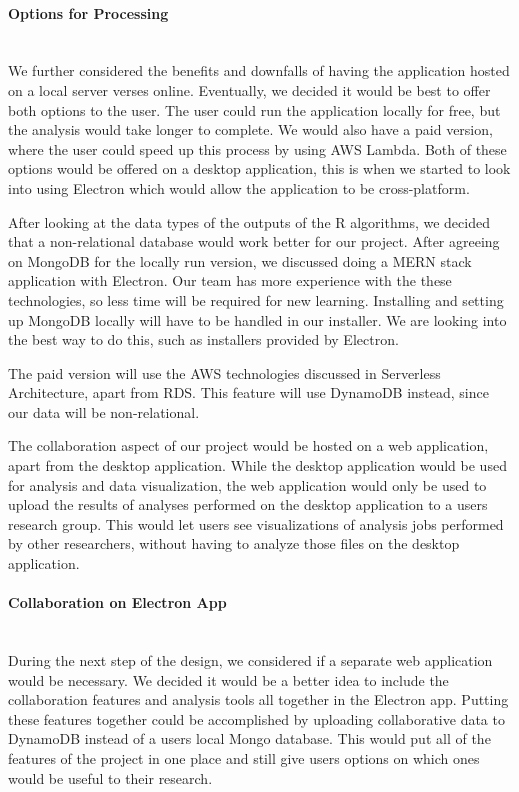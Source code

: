 \paragraph{Options for Processing} \mbox{}\\[\paragraphheaderspace]
We further considered the benefits and downfalls of having the application hosted on a local server verses online. Eventually, we decided it would be best to offer both options to the user. The user could run the application locally for free, but the analysis would take longer to complete. We would also have a paid version, where the user could speed up this process by using AWS Lambda. Both of these options would be offered on a desktop application, this is when we started to look into using Electron which would allow the application to be cross-platform.\par
After looking at the data types of the outputs of the  R algorithms, we decided that a non-relational database would work better for our project. After agreeing on MongoDB for the locally run version, we discussed doing a MERN stack application with Electron. Our team has more experience with the these technologies, so less time will be required for new learning. Installing and setting up MongoDB locally will have to be handled in our installer. We are looking into the best way to do this, such as installers provided by Electron.\par
The paid version will use the AWS technologies discussed in Serverless Architecture, apart from RDS. This feature will use DynamoDB instead, since our data will be non-relational.\par
The collaboration aspect of our project would be hosted on a web application, apart from the desktop application. While the desktop application would be used for analysis and data visualization, the web application would only be used to upload the results of analyses performed on the desktop application to a user\textquotesingle s research group. This would let users see visualizations of analysis jobs performed by other researchers, without having to analyze those files on the desktop application.\par

\paragraph{Collaboration on Electron App} \mbox{}\\[\paragraphheaderspace]
During the next step of the design, we considered if a separate web application would be necessary. We decided it would be a better idea to include the collaboration features and analysis tools all together in the Electron app. Putting these features together could be accomplished by uploading collaborative data to DynamoDB instead of a user\textquotesingle s local Mongo database. This would put all of the features of the project in one place and still give users options on which ones would be useful to their research.\par

